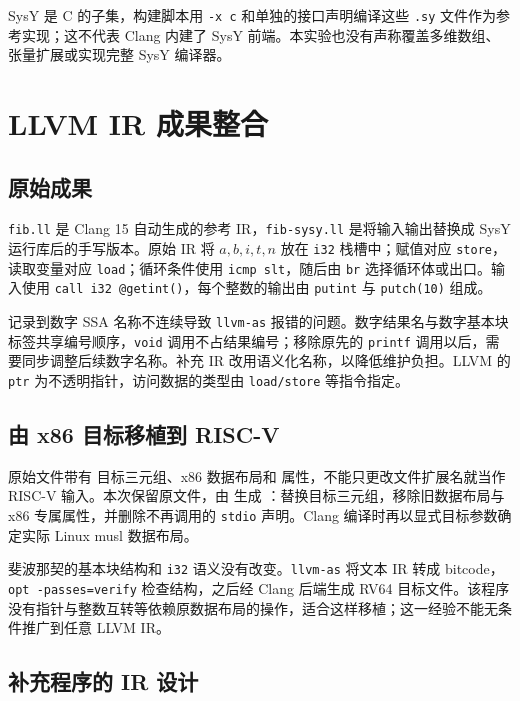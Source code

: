 \documentclass[UTF8,a4paper,10pt]{ctexart}
\begin{document}
SysY 是 C 的子集，构建脚本用 \texttt{-x c} 和单独的接口声明编译这些 \texttt{.sy} 文件作为参考实现；这不代表 Clang 内建了 SysY 前端。本实验也没有声称覆盖多维数组、张量扩展或实现完整 SysY 编译器。

\section{LLVM IR 成果整合}

\subsection{原始成果}

\texttt{fib.ll} 是 Clang 15 自动生成的参考 IR，\texttt{fib-sysy.ll} 是将输入输出替换成 SysY 运行库后的手写版本。原始 IR 将 $a,b,i,t,n$ 放在 \texttt{i32} 栈槽中；赋值对应 \texttt{store}，读取变量对应 \texttt{load}；循环条件使用 \texttt{icmp slt}，随后由 \texttt{br} 选择循环体或出口。输入使用 \texttt{call i32 @getint()}，每个整数的输出由 \texttt{putint} 与 \texttt{putch(10)} 组成。

记录到数字 SSA 名称不连续导致 \texttt{llvm-as} 报错的问题。数字结果名与数字基本块标签共享编号顺序，\texttt{void} 调用不占结果编号；移除原先的 \texttt{printf} 调用以后，需要同步调整后续数字名称。补充 IR 改用语义化名称，以降低维护负担。LLVM 的 \texttt{ptr} 为不透明指针，访问数据的类型由 \texttt{load/store} 等指令指定\cite{llvm-langref}。

\subsection{由 x86 目标移植到 RISC-V}

原始文件带有  目标三元组、x86 数据布局和
 属性，不能只更改文件扩展名就当作 RISC-V 输入。本次保留原文件，由  生成 ：替换目标三元组，移除旧数据布局与 x86 专属属性，并删除不再调用的 \texttt{stdio} 声明。Clang 编译时再以显式目标参数确定实际 Linux musl 数据布局。

斐波那契的基本块结构和 \texttt{i32} 语义没有改变。\texttt{llvm-as} 将文本 IR 转成 bitcode，\texttt{opt -passes=verify} 检查结构，之后经 Clang 后端生成 RV64 目标文件。该程序没有指针与整数互转等依赖原数据布局的操作，适合这样移植；这一经验不能无条件推广到任意 LLVM IR。

\subsection{补充程序的 IR 设计}
\end{document}
